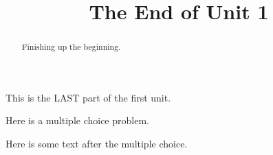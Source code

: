 \documentclass{ximera}
\title{The End of Unit 1}
\begin{document}
\begin{abstract}
  Finishing up the beginning.
\end{abstract}

This is the LAST part of the first unit.

\begin{exercise}
  Here is a multiple choice problem.
  \begin{solution}
    \begin{multipleChoice}
    \end{multipleChoice}
  \end{solution}

  Here is some text after the multiple choice.
\end{exercise}
\end{document}
